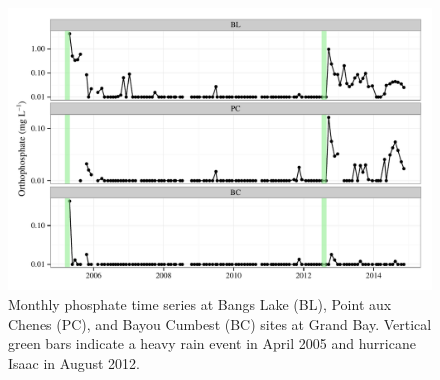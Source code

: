 \documentclass[letterpaper,12pt]{article}\usepackage[]{graphicx}\usepackage[]{color}
\makeatletter
\def\maxwidth{ %
  \ifdim\Gin@nat@width>\linewidth
    \linewidth
  \else
    \Gin@nat@width
  \fi
}
\makeatother
\begin{document}
\clearpage

\begin{figure}[!ht]

{\centering \includegraphics[width=\maxwidth]{figs/orthtsfig-1} 

}

\caption[Monthly phosphate time series at Bangs Lake (BL), Point aux Chenes (PC), and Bayou Cumbest (BC) sites at Grand Bay]{Monthly phosphate time series at Bangs Lake (BL), Point aux Chenes (PC), and Bayou Cumbest (BC) sites at Grand Bay. Vertical green bars indicate a heavy rain event in April 2005 and hurricane Isaac in August 2012.}\label{fig:orthtsfig}
\end{figure}


\clearpage
\end{document}
